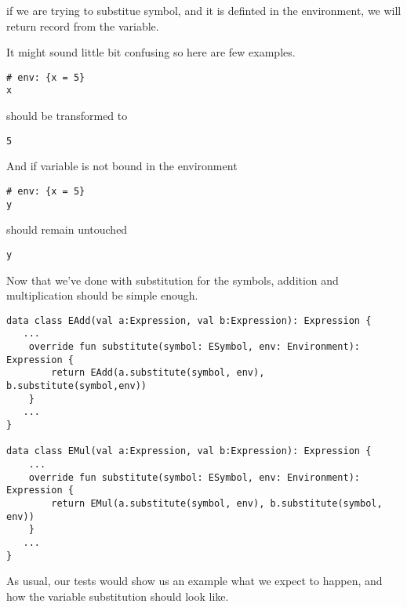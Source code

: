 \documentclass[11pt]{article}
\begin{document}
if we are trying to substitue symbol, and it is definted in the environment, we will return record from the variable.

It might sound little bit confusing so here are few examples.

\begin{verbatim}
# env: {x = 5}
x
\end{verbatim}

should be transformed to

\begin{verbatim}
5
\end{verbatim}

And if variable is not bound in the environment
\begin{verbatim}
# env: {x = 5}
y
\end{verbatim}

should remain untouched
\begin{verbatim}
y
\end{verbatim}


Now that we've done with substitution for the symbols, addition and multiplication should be simple enough.

\begin{verbatim}
data class EAdd(val a:Expression, val b:Expression): Expression {
   ...
    override fun substitute(symbol: ESymbol, env: Environment): Expression {
        return EAdd(a.substitute(symbol, env), b.substitute(symbol,env))
    }
   ...
}

data class EMul(val a:Expression, val b:Expression): Expression {
    ...
    override fun substitute(symbol: ESymbol, env: Environment): Expression {
        return EMul(a.substitute(symbol, env), b.substitute(symbol, env))
    }
   ...
}

\end{verbatim}

As usual, our tests would show us an example what we expect to happen, and how the variable substitution should look like.
\end{document}
